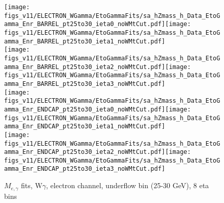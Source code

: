 \begin{figure}[htb]
  \begin{center}
   \texttt{[image: figs\_v11/ELECTRON\_WGamma/EtoGammaFits/sa\_hZmass\_h\_Data\_EtoGamma\_Enr\_BARREL\_pt25to30\_ieta0\_noWMtCut.pdf]}\texttt{[image: figs\_v11/ELECTRON\_WGamma/EtoGammaFits/sa\_hZmass\_h\_Data\_EtoGamma\_Enr\_BARREL\_pt25to30\_ieta1\_noWMtCut.pdf]}\\
   \texttt{[image: figs\_v11/ELECTRON\_WGamma/EtoGammaFits/sa\_hZmass\_h\_Data\_EtoGamma\_Enr\_BARREL\_pt25to30\_ieta2\_noWMtCut.pdf]}\texttt{[image: figs\_v11/ELECTRON\_WGamma/EtoGammaFits/sa\_hZmass\_h\_Data\_EtoGamma\_Enr\_BARREL\_pt25to30\_ieta3\_noWMtCut.pdf]}\\
   \texttt{[image: figs\_v11/ELECTRON\_WGamma/EtoGammaFits/sa\_hZmass\_h\_Data\_EtoGamma\_Enr\_ENDCAP\_pt25to30\_ieta0\_noWMtCut.pdf]}\texttt{[image: figs\_v11/ELECTRON\_WGamma/EtoGammaFits/sa\_hZmass\_h\_Data\_EtoGamma\_Enr\_ENDCAP\_pt25to30\_ieta1\_noWMtCut.pdf]}\\
   \texttt{[image: figs\_v11/ELECTRON\_WGamma/EtoGammaFits/sa\_hZmass\_h\_Data\_EtoGamma\_Enr\_ENDCAP\_pt25to30\_ieta2\_noWMtCut.pdf]}\texttt{[image: figs\_v11/ELECTRON\_WGamma/EtoGammaFits/sa\_hZmass\_h\_Data\_EtoGamma\_Enr\_ENDCAP\_pt25to30\_ieta3\_noWMtCut.pdf]}\\
  \label{fig:etogFits_25to30}
  \caption{$M_{e,\gamma}$ fits, W$\gamma$, electron channel, underflow bin (25-30 GeV), 8 eta bins}
  \end{center}
\end{figure}

